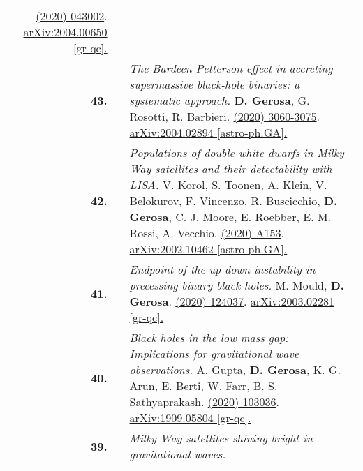 {\begin{longtable}{rp{0.3cm}p{15.8cm}}
\href{https://journals.aps.org/prd/abstract/10.1103/PhysRevD.102.043002}{\prd 102 (2020) 043002}. \href{https://arxiv.org/abs/2004.00650}{arXiv:2004.00650 [gr-qc].}
\vspace{0.09cm}\\
%
\textbf{43.} & & \textit{The Bardeen-Petterson effect in accreting supermassive black-hole binaries: a systematic approach.}
\newline{}
\textbf{D. Gerosa}, G. Rosotti, R. Barbieri.
\newline{}
\href{https://doi.org/10.1093/mnras/staa1693}{\mnras 496 (2020) 3060-3075}. \href{https://arxiv.org/abs/2004.02894}{arXiv:2004.02894 [astro-ph.GA].}
\vspace{0.09cm}\\
%
\textbf{42.} & & \textit{Populations of double white dwarfs in Milky Way satellites and their detectability with LISA.}
\newline{}
V. Korol, S. Toonen, A. Klein, V. Belokurov, F. Vincenzo, R. Buscicchio, \textbf{D. Gerosa}, C. J. Moore, E. Roebber, E. M. Rossi, A. Vecchio.
\newline{}
\href{https://www.aanda.org/articles/aa/abs/2020/06/aa37764-20/aa37764-20.html}{\aap 638 (2020) A153}. \href{https://arxiv.org/abs/2002.10462}{arXiv:2002.10462 [astro-ph.GA].}
\vspace{0.09cm}\\
%
\textbf{41.} & & \textit{Endpoint of the up-down instability in precessing binary black holes.}
\newline{}
M. Mould, \textbf{D. Gerosa}.
\newline{}
\href{https://journals.aps.org/prd/abstract/10.1103/PhysRevD.101.124037}{\prd 101 (2020) 124037}. \href{https://arxiv.org/abs/2003.02281}{arXiv:2003.02281 [gr-qc].}
\vspace{0.09cm}\\
%
\textbf{40.} & & \textit{Black holes in the low mass gap: Implications for gravitational wave observations.}
\newline{}
A. Gupta, \textbf{D. Gerosa}, K. G. Arun, E. Berti, W. Farr, B. S. Sathyaprakash.
\newline{}
\href{https://journals.aps.org/prd/abstract/10.1103/PhysRevD.101.103036}{\prd 101 (2020) 103036}. \href{https://arxiv.org/abs/1909.05804}{arXiv:1909.05804 [gr-qc].}
\vspace{0.09cm}\\
%
\textbf{39.} & & \textit{Milky Way satellites shining bright in gravitational waves.}
\newline{}

\end{longtable}}
